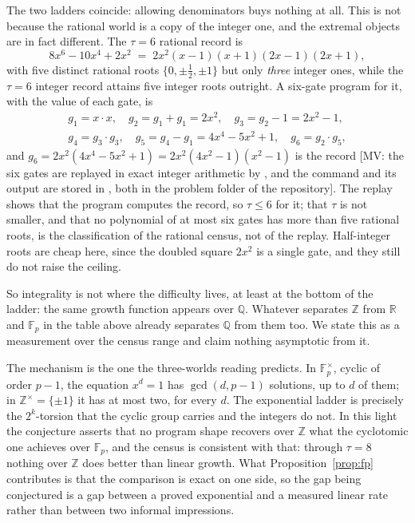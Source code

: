 \documentclass[11pt]{article}
\theoremstyle{definition}
\theoremstyle{remark}
\begin{document}
The two ladders coincide: allowing denominators buys nothing at all. This is
not because the rational world is a copy of the integer one, and the extremal
objects are in fact different. The $\tau = 6$ rational record is
\[
  8x^6 - 10x^4 + 2x^2 \;=\; 2x^2(x-1)(x+1)(2x-1)(2x+1),
\]
with five distinct rational roots $\{0, \pm\tfrac12, \pm 1\}$ but only
\emph{three} integer ones, while the $\tau = 6$ integer record attains five
integer roots outright. A six-gate program for it, with the value of each gate, is
\[
\begin{gathered}
  g_1 = x\cdot x,\quad g_2 = g_1 + g_1 = 2x^2,\quad g_3 = g_2 - 1 = 2x^2 - 1,\\
  g_4 = g_3\cdot g_3,\quad g_5 = g_4 - g_1 = 4x^4 - 5x^2 + 1,\quad
  g_6 = g_2\cdot g_5 ,
\end{gathered}
\]
and $g_6 = 2x^2(4x^4 - 5x^2 + 1) = 2x^2(4x^2-1)(x^2-1)$ is the record [MV: the six gates are replayed in exact integer arithmetic by
, and the command and its output are stored in
, both in the problem folder of the repository]. The replay shows that
the program computes the record, so $\tau \le 6$ for it; that $\tau$ is not smaller, and that no
polynomial of at most six gates has more than five rational roots, is the classification of the
rational census, not of the replay. Half-integer
roots are cheap here, since the doubled square $2x^2$ is a single gate, and they still do not
raise the ceiling.

So integrality is not where the difficulty lives, at least at the bottom of the
ladder: the same growth function appears over $\mathbb{Q}$. Whatever separates
$\mathbb{Z}$ from $\mathbb{R}$ and $\mathbb{F}_p$ in the table above already
separates $\mathbb{Q}$ from them too. We state this as a measurement over the
census range and claim nothing asymptotic from it.

The mechanism is the one the three-worlds reading predicts. In
$\mathbb{F}_p^{\times}$, cyclic of order $p-1$, the equation $x^d = 1$ has
$\gcd(d,p-1)$ solutions, up to $d$ of them; in $\mathbb{Z}^{\times} =
\{\pm 1\}$ it has at most two, for every $d$. The exponential ladder is
precisely the $2^k$-torsion that the cyclic group carries and the integers do
not. In this light the conjecture asserts that no program shape recovers over
$\mathbb{Z}$ what the cyclotomic one achieves over $\mathbb{F}_p$, and the
census is consistent with that: through $\tau = 8$ nothing over $\mathbb{Z}$
does better than linear growth. What Proposition~\ref{prop:fp} contributes is
that the comparison is exact on one side, so the gap being conjectured is
a gap between a proved exponential and a measured linear rate rather than
between two informal impressions.
\end{document}

